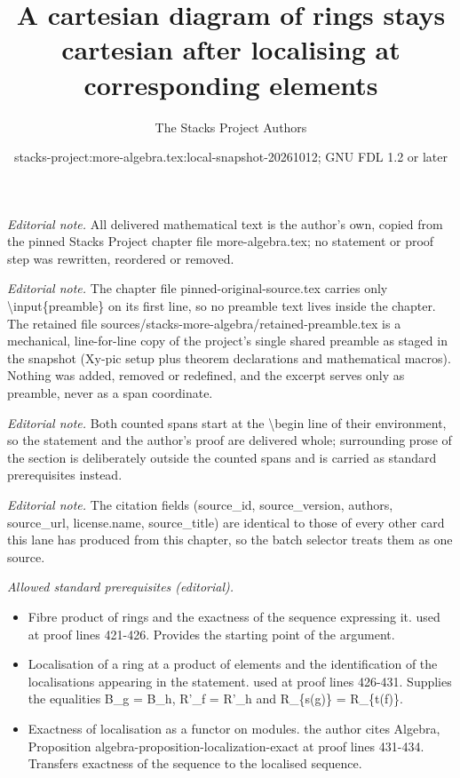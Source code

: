 \documentclass[10pt,a4paper]{amsart}
\title{A cartesian diagram of rings stays cartesian after localising at corresponding elements}
\author{The Stacks Project Authors}
\date{stacks-project:more-algebra.tex:local-snapshot-20261012; GNU FDL 1.2 or later}
\theoremstyle{plain}
\theoremstyle{definition}
\theoremstyle{remark}
\numberwithin{equation}{subsection}
\begin{document}
\maketitle
\setcounter{subsection}{1}
\noindent\textit{Editorial note.} All delivered mathematical text is the author's own, copied from the pinned Stacks Project chapter file more-algebra.tex; no statement or proof step was rewritten, reordered or removed.\par\medskip
\noindent\textit{Editorial note.} The chapter file pinned-original-source.tex carries only \textbackslash{}input\{preamble\} on its first line, so no preamble text lives inside the chapter. The retained file sources/stacks-more-algebra/retained-preamble.tex is a mechanical, line-for-line copy of the project's single shared preamble as staged in the snapshot (Xy-pic setup plus theorem declarations and mathematical macros). Nothing was added, removed or redefined, and the excerpt serves only as preamble, never as a span coordinate.\par\medskip
\noindent\textit{Editorial note.} Both counted spans start at the \textbackslash{}begin line of their environment, so the statement and the author's proof are delivered whole; surrounding prose of the section is deliberately outside the counted spans and is carried as standard prerequisites instead.\par\medskip
\noindent\textit{Editorial note.} The citation fields (source\_id, source\_version, authors, source\_url, license.name, source\_title) are identical to those of every other card this lane has produced from this chapter, so the batch selector treats them as one source.\par\medskip
\noindent\textit{Allowed standard prerequisites (editorial).}\begin{itemize}
\item Fibre product of rings and the exactness of the sequence expressing it. used at proof lines 421-426. Provides the starting point of the argument.
\item Localisation of a ring at a product of elements and the identification of the localisations appearing in the statement. used at proof lines 426-431. Supplies the equalities B\_g = B\_h, R'\_f = R'\_h and R\_\{s(g)\} = R\_\{t(f)\}.
\item Exactness of localisation as a functor on modules. the author cites Algebra, Proposition algebra-proposition-localization-exact at proof lines 431-434. Transfers exactness of the sequence to the localised sequence.
\end{itemize}\medskip
\end{document}
